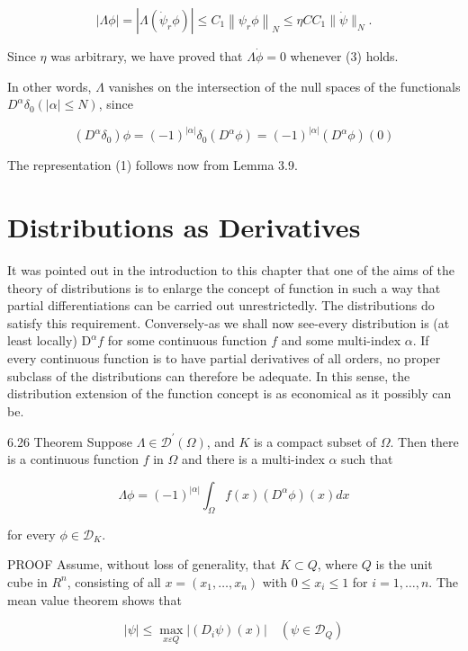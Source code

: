 \documentclass[10pt]{article}
\begin{document}
$$
|\Lambda \phi|=\left|\Lambda\left(\dot{\psi}_{r} \phi\right)\right| \leq C_{1}\left\|\psi_{r} \phi\right\|_{N} \leq \eta C C_{1}\|\dot{\psi}\|_{N} .
$$

Since $\eta$ was arbitrary, we have proved that $\Lambda \dot{\phi}=0$ whenever (3) holds.

In other words, $\Lambda$ vanishes on the intersection of the null spaces of the functionals $D^{\alpha} \delta_{0}(|\alpha| \leq N)$, since

$$
\left(D^{\alpha} \delta_{0}\right) \phi=(-1)^{|\alpha|} \delta_{0}\left(D^{\alpha} \phi\right)=(-1)^{|\alpha|}\left(D^{\alpha} \phi\right)(0)
$$

The representation (1) follows now from Lemma 3.9.

\section{Distributions as Derivatives}
It was pointed out in the introduction to this chapter that one of the aims of the theory of distributions is to enlarge the concept of function in such a way that partial differentiations can be carried out unrestrictedly. The distributions do satisfy this requirement. Conversely-as we shall now see-every distribution is (at least locally) $\mathrm{D}^{\alpha} f$ for some continuous function $f$ and some multi-index $\alpha$. If every continuous function is to have partial derivatives of all orders, no proper subclass of the distributions can therefore be adequate. In this sense, the distribution extension of the function concept is as economical as it possibly can be.

6.26 Theorem Suppose $\Lambda \in \mathscr{D}^{\prime}(\Omega)$, and $K$ is a compact subset of $\Omega$. Then there is a continuous function $f$ in $\Omega$ and there is a multi-index $\alpha$ such that

$$
\Lambda \phi=(-1)^{|\alpha|} \int_{\Omega} f(x)\left(D^{\alpha} \phi\right)(x) d x
$$

for every $\phi \in \mathscr{D}_{K}$.

PROOF Assume, without loss of generality, that $K \subset Q$, where $Q$ is the unit cube in $R^{n}$, consisting of all $x=\left(x_{1}, \ldots, x_{n}\right)$ with $0 \leq x_{i} \leq 1$ for $i=1, \ldots, n$. The mean value theorem shows that

$$
|\psi| \leq \max _{x \varepsilon Q}\left|\left(D_{i} \psi\right)(x)\right| \quad\left(\psi \in \mathscr{D}_{Q}\right)
$$
\end{document}

